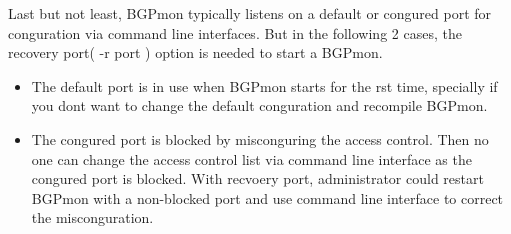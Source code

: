Last but not least, BGPmon typically listens on a default or congured port for conguration via command line interfaces. 
But in the following 2 cases, the recovery port( -r port ) option is needed to start a BGPmon.
 \begin{itemize}
	 	\item{ The default port is in use when BGPmon starts for the rst time, specially if you dont want to change the default conguration and recompile BGPmon. }
		\item{ The congured port is blocked by misconguring the access control. Then no one can change the access control list via command line interface as the congured port is blocked. 
				With recvoery port, administrator could restart BGPmon with a non-blocked port and use command line interface to correct the misconguration. }
\end{itemize} 
